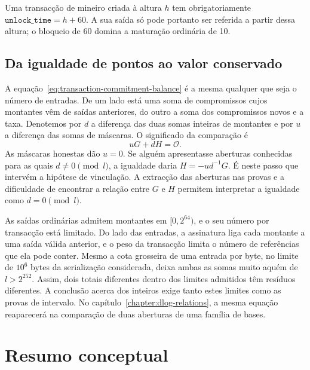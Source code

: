 %
Uma transacção de mineiro criada à altura \(h\) tem obrigatoriamente
\(\texttt{unlock\_time}=h+60\). A sua saída só pode portanto ser referida a
partir dessa altura; o bloqueio de 60 domina a maturação ordinária de 10.


\subsection{Da igualdade de pontos ao valor conservado}
\label{gamma}

A equação~\eqref{eq:transaction-commitment-balance} é a mesma
qualquer que seja o número de entradas. De um lado está uma soma de
compromissos cujos montantes vêm de saídas anteriores, do outro a soma
dos compromissos novos e a taxa. Denotemos por \(d\) a diferença das
duas somas inteiras de montantes e por \(u\) a diferença das somas
de máscaras. O significado da comparação é
\[
                            uG+dH=\mathcal O.
\]
As máscaras honestas dão \(u=0\). Se alguém apresentasse aberturas
conhecidas para as quais \(d\ne0\pmod l\), a igualdade daria
\(H=-u d^{-1}G\). É neste passo que intervém a hipótese de vinculação.
A extracção das aberturas nas provas e a dificuldade de encontrar a
relação entre \(G\) e \(H\) permitem interpretar a igualdade como
\(d=0\pmod l\).

As saídas ordinárias admitem montantes em \([0,2^{64})\), e o seu
número por transacção está limitado. Do lado das entradas, a
assinatura liga cada montante a uma saída válida anterior, e o peso
da transacção limita o número de referências que ela pode conter.
Mesmo a cota grosseira de uma entrada por byte, no limite de
\(10^6\) bytes da serialização considerada, deixa ambas as somas
muito aquém de \(l>2^{252}\). Assim, dois totais diferentes dentro
dos limites admitidos têm resíduos diferentes. A conclusão acerca
dos inteiros exige tanto estes limites como as provas de intervalo.
No capítulo~\ref{chapter:dlog-relations}, a mesma equação reaparecerá
na comparação de duas aberturas de uma família de bases.



\section{Resumo conceptual}
\label{sec:transaction_summary}

